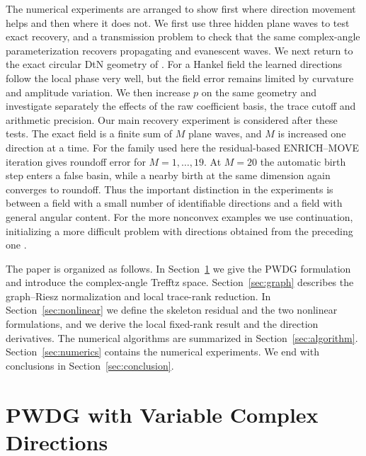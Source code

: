 \documentclass[pdflatex,sn-mathphys-num]{sn-jnl}
\theoremstyle{thmstyleone}
\theoremstyle{thmstyletwo}
\begin{document}
The numerical experiments are arranged to show first where direction movement helps and then where it does not.  We first use three hidden plane waves to test exact recovery, and a transmission problem to check that the same complex-angle parameterization recovers propagating and evanescent waves.  We next return to the exact circular DtN geometry of \cite{KapitaMonk2018}.  For a Hankel field the learned directions follow the local phase very well, but the field error remains limited by curvature and amplitude variation.  We then increase $p$ on the same geometry and investigate separately the effects of the raw coefficient basis, the trace cutoff and arithmetic precision.  Our main recovery experiment is considered after these tests.  The exact field is a finite sum of $M$ plane waves, and $M$ is increased one direction at a time.  For the family used here the residual-based ENRICH--MOVE iteration gives roundoff error for $M=1,\ldots,19$.  At $M=20$ the automatic birth step enters a false basin, while a nearby birth at the same dimension again converges to roundoff.  Thus the important distinction in the experiments is between a field with a small number of identifiable directions and a field with general angular content.  For the more nonconvex examples we use continuation, initializing a more difficult problem with directions obtained from the preceding one \cite{Watson1989}.

The paper is organized as follows.  In Section~\ref{sec:pwdg} we give the PWDG formulation and introduce the complex-angle Trefftz space.  Section~\ref{sec:graph} describes the graph--Riesz normalization and local trace-rank reduction.  In Section~\ref{sec:nonlinear} we define the skeleton residual and the two nonlinear formulations, and we derive the local fixed-rank result and the direction derivatives.  The numerical algorithms are summarized in Section~\ref{sec:algorithm}.  Section~\ref{sec:numerics} contains the numerical experiments.  We end with conclusions in Section~\ref{sec:conclusion}.

\section{PWDG with Variable Complex Directions}\label{sec:pwdg}
\end{document}
